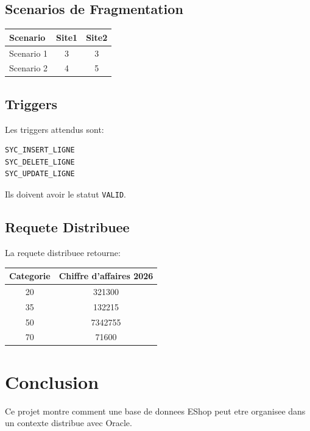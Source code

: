 \documentclass[12pt,a4paper]{report}
\begin{document}
\section{Scenarios de Fragmentation}

\begin{center}
\begin{tabular}{|l|c|c|}
\hline
Scenario & Site1 & Site2 \\
\hline
Scenario 1 & 3 & 3 \\
\hline
Scenario 2 & 4 & 5 \\
\hline
\end{tabular}
\end{center}

\section{Triggers}

Les triggers attendus sont:

\begin{lstlisting}[style=textstyle]
SYC_INSERT_LIGNE
SYC_DELETE_LIGNE
SYC_UPDATE_LIGNE
\end{lstlisting}

Ils doivent avoir le statut \texttt{VALID}.

\section{Requete Distribuee}

La requete distribuee retourne:

\begin{center}
\begin{tabular}{|c|c|}
\hline
Categorie & Chiffre d'affaires 2026 \\
\hline
20 & 321300 \\
\hline
35 & 132215 \\
\hline
50 & 7342755 \\
\hline
70 & 71600 \\
\hline
\end{tabular}
\end{center}

\chapter{Conclusion}

Ce projet montre comment une base de donnees EShop peut etre organisee dans un contexte distribue avec Oracle.
\end{document}
